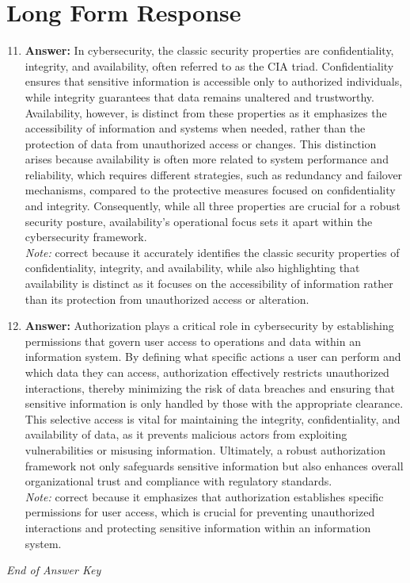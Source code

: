 \documentclass[12pt]{article}
\begin{document}
\section*{Long Form Response}
\begin{enumerate}[label=\arabic*.]
\setcounter{enumi}{10}
\item \textbf{Answer:} In cybersecurity, the classic security properties are confidentiality, integrity, and availability, often referred to as the CIA triad. Confidentiality ensures that sensitive information is accessible only to authorized individuals, while integrity guarantees that data remains unaltered and trustworthy. Availability, however, is distinct from these properties as it emphasizes the accessibility of information and systems when needed, rather than the protection of data from unauthorized access or changes. This distinction arises because availability is often more related to system performance and reliability, which requires different strategies, such as redundancy and failover mechanisms, compared to the protective measures focused on confidentiality and integrity. Consequently, while all three properties are crucial for a robust security posture, availability's operational focus sets it apart within the cybersecurity framework.
\\ \textit{Note:} correct because it accurately identifies the classic security properties of confidentiality, integrity, and availability, while also highlighting that availability is distinct as it focuses on the accessibility of information rather than its protection from unauthorized access or alteration.
\item \textbf{Answer:} Authorization plays a critical role in cybersecurity by establishing permissions that govern user access to operations and data within an information system. By defining what specific actions a user can perform and which data they can access, authorization effectively restricts unauthorized interactions, thereby minimizing the risk of data breaches and ensuring that sensitive information is only handled by those with the appropriate clearance. This selective access is vital for maintaining the integrity, confidentiality, and availability of data, as it prevents malicious actors from exploiting vulnerabilities or misusing information. Ultimately, a robust authorization framework not only safeguards sensitive information but also enhances overall organizational trust and compliance with regulatory standards.
\\ \textit{Note:} correct because it emphasizes that authorization establishes specific permissions for user access, which is crucial for preventing unauthorized interactions and protecting sensitive information within an information system.
\end{enumerate}

\vfill
\noindent\textit{End of Answer Key}
\end{document}
